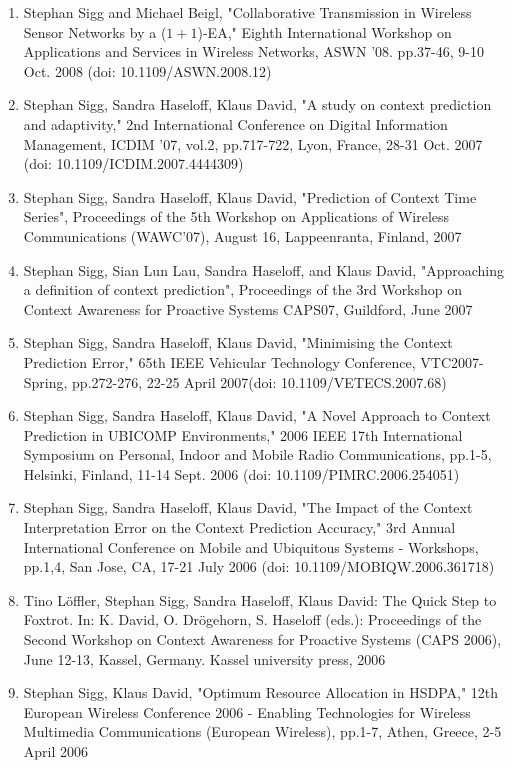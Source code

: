 \documentclass[10pt]{article}
\newcounter{saveenumi}
\begin{document}
\begin{enumerate}
\item Stephan Sigg and Michael Beigl, "Collaborative Transmission in Wireless Sensor Networks by a ($1+1$)-EA," Eighth International Workshop on Applications and Services in Wireless Networks, ASWN '08. pp.37-46, 9-10 Oct. 2008 (doi: 10.1109/ASWN.2008.12)
\item Stephan Sigg, Sandra Haseloff, Klaus David, "A study on context prediction and adaptivity," 2nd International Conference on Digital Information Management, ICDIM '07, vol.2, pp.717-722, Lyon, France, 28-31 Oct. 2007 (doi: 10.1109/ICDIM.2007.4444309)
\item Stephan Sigg, Sandra Haseloff, Klaus David, "Prediction of Context Time Series", Proceedings of the 5th Workshop on Applications of Wireless Communications (WAWC'07), August 16, Lappeenranta, Finland, 2007
\item Stephan Sigg, Sian Lun Lau, Sandra Haseloff, and Klaus David, "Approaching a definition of context prediction", Proceedings of the 3rd Workshop on Context Awareness for Proactive Systems CAPS07, Guildford, June 2007
\item Stephan Sigg, Sandra Haseloff, Klaus David, "Minimising the Context Prediction Error,"  65th IEEE Vehicular Technology Conference, VTC2007-Spring, pp.272-276, 22-25 April 2007\linebreak (doi: 10.1109/VETECS.2007.68)
\item Stephan Sigg, Sandra Haseloff, Klaus David, "A Novel Approach to Context Prediction in UBICOMP Environments," 2006 IEEE 17th International Symposium on Personal, Indoor and Mobile Radio Communications, pp.1-5, Helsinki, Finland, 11-14 Sept. 2006 (doi: 10.1109/PIMRC.2006.254051)
\item Stephan Sigg, Sandra Haseloff, Klaus David, "The Impact of the Context Interpretation Error on the Context Prediction Accuracy," 3rd Annual International Conference on Mobile and Ubiquitous Systems - Workshops, pp.1,4, San Jose, CA, 17-21 July 2006 (doi: 10.1109/MOBIQW.2006.361718)
\item Tino Löffler, Stephan Sigg, Sandra Haseloff, Klaus David: The Quick Step to Foxtrot. In: K. David, O. Drögehorn, S. Haseloff (eds.): Proceedings of the Second Workshop on Context Awareness for Proactive Systems (CAPS 2006), June 12-13, Kassel, Germany. Kassel university press, 2006
\item Stephan Sigg, Klaus David, "Optimum Resource Allocation in HSDPA," 12th European Wireless Conference 2006 - Enabling Technologies for Wireless Multimedia Communications (European Wireless), pp.1-7, Athen, Greece, 2-5 April 2006
\setcounter{saveenumi}{\value{enumi}}
\end{enumerate}
\end{document}
